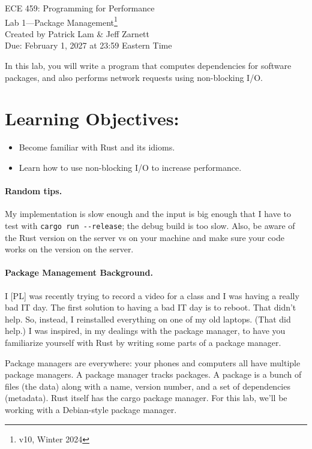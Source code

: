 \documentclass[12pt]{article}
\renewcommand{\_}{\kern-1.5pt\textunderscore\kern-1.5pt}
\begin{document}
\begin{center}
{\Large ECE 459: Programming for Performance}\\
{\Large Lab 1---Package Management\footnote{v10, Winter 2024}}\\[1em]
Created by Patrick Lam \& Jeff Zarnett\\
Due: February 1, 2027 at 23:59 Eastern Time
\end{center}


\vspace{1em}
In this lab, you will write a program that computes dependencies for software packages, and also performs network requests using non-blocking I/O.

\section*{Learning Objectives:}
\begin{itemize}
	\item Become familiar with Rust and its idioms.
	\item Learn how to use non-blocking I/O to increase performance.
\end{itemize}

\paragraph*{Random tips.} My implementation is slow enough and the input is big enough that I have to test with \verb+cargo run --release+; the debug build is too slow. Also, be aware of the Rust version on the server vs on your machine and make sure your code works on the version on the server.


\paragraph*{Package Management Background.}
I [PL] was recently trying to record a video for a class and I was having a really bad IT day. The first solution to having a bad IT day is to reboot. That didn't help. So, instead, I reinstalled everything on one of my old laptops. (That did help.) I was inspired, in my dealings with the package manager, to have you familiarize yourself with Rust by writing some parts of a package manager. \par

\vspace{1em}
Package managers are everywhere: your phones and computers all have multiple package managers. A package manager tracks packages. A package is a bunch of files (the data) along with a name, version number, and a set of dependencies (metadata). Rust itself has the cargo package manager. For this lab, we'll be working with a Debian-style package manager. \par
\end{document}
